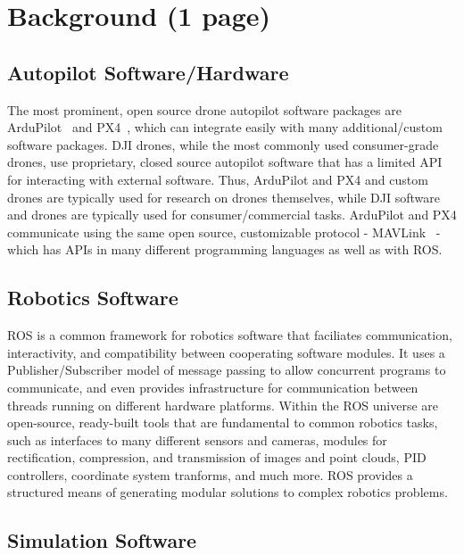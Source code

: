 \section{Background (1 page)}

\subsection{Autopilot Software/Hardware}

The most prominent, open source drone autopilot software packages are ArduPilot~\cite{ardupilot_website} and PX4~\cite{pixhawk_website},
which can integrate easily with many additional/custom software packages.
DJI drones, while the most commonly used consumer-grade drones, use proprietary, closed source autopilot software
that has a limited API for interacting with external software.
Thus, ArduPilot and PX4 and custom drones are typically used for research on drones themselves,
while DJI software and drones are typically used for consumer/commercial tasks.
ArduPilot and PX4 communicate using the same open source, customizable protocol - MAVLink~\cite{mavlink_io} -
which has APIs in many different programming languages as well as with \gls{ROS}.

\subsection{Robotics Software}

\gls{ROS} is a common framework for robotics software that faciliates communication, interactivity, and compatibility
between cooperating software modules.
It uses a Publisher/Subscriber model of message passing to allow concurrent programs to communicate,
and even provides infrastructure for communication between threads running on different hardware platforms.
Within the ROS universe are open-source, ready-built tools that are fundamental to common robotics tasks,
such as interfaces to many different sensors and cameras,
modules for rectification, compression, and transmission of images and point clouds,
PID controllers,
coordinate system tranforms,
and much more.
ROS provides a structured means of generating modular solutions to complex robotics problems.

\subsection{Simulation Software}

